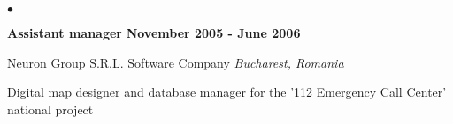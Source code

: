 \documentclass[margin,line]{res}
\newenvironment{list1}{
  \begin{list}{\ding{113}}{%
      \setlength{\itemsep}{0in}
      \setlength{\parsep}{0in} \setlength{\parskip}{0in}
      \setlength{\topsep}{0in} \setlength{\partopsep}{0in} 
      \setlength{\leftmargin}{0.17in}}}{\end{list}}
\newenvironment{list2}{
  \begin{list}{$\bullet$}{%
      \setlength{\itemsep}{0in}
      \setlength{\parsep}{0in} \setlength{\parskip}{0in}
      \setlength{\topsep}{0in} \setlength{\partopsep}{0in} 
      \setlength{\leftmargin}{0.2in}}}{\end{list}}
\begin{document}
\begin{resume}
\begin{list2}
\item[] {\bf Assistant manager} \hfill {\bf November 2005 - June 2006}
\begin{list1}
\item[] Neuron Group S.R.L. Software Company \hfill \textit{Bucharest, Romania}
\item[] Digital map designer and database manager for the '112 Emergency Call Center' national project
\end{list1}
\end{list2}

%
%
%
%

\end{resume}
\end{document}
